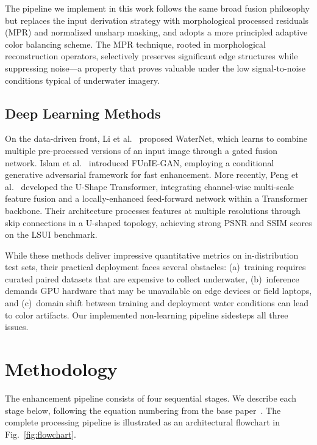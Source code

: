 \documentclass[conference]{IEEEtran}
\begin{document}
The pipeline we implement in this work follows the same broad fusion philosophy but replaces the input derivation strategy with morphological processed residuals (MPR) and normalized unsharp masking, and adopts a more principled adaptive color balancing scheme. The MPR technique, rooted in morphological reconstruction operators, selectively preserves significant edge structures while suppressing noise---a property that proves valuable under the low signal-to-noise conditions typical of underwater imagery.

\subsection{Deep Learning Methods}

On the data-driven front, Li et al.~\cite{li2020underwater} proposed WaterNet, which learns to combine multiple pre-processed versions of an input image through a gated fusion network. Islam et al.~\cite{islam2020fast} introduced FUnIE-GAN, employing a conditional generative adversarial framework for fast enhancement. More recently, Peng et al.~\cite{peng2023ushape} developed the U-Shape Transformer, integrating channel-wise multi-scale feature fusion and a locally-enhanced feed-forward network within a Transformer backbone. Their architecture processes features at multiple resolutions through skip connections in a U-shaped topology, achieving strong PSNR and SSIM scores on the LSUI benchmark.

While these methods deliver impressive quantitative metrics on in-distribution test sets, their practical deployment faces several obstacles: (a)~training requires curated paired datasets that are expensive to collect underwater, (b)~inference demands GPU hardware that may be unavailable on edge devices or field laptops, and (c)~domain shift between training and deployment water conditions can lead to color artifacts. Our implemented non-learning pipeline sidesteps all three issues.


\section{Methodology}

The enhancement pipeline consists of four sequential stages. We describe each stage below, following the equation numbering from the base paper~\cite{basepaper2026}. The complete processing pipeline is illustrated as an architectural flowchart in Fig.~\ref{fig:flowchart}.
\end{document}
